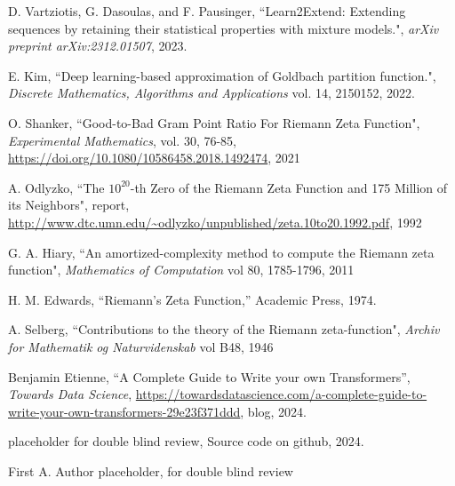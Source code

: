 \documentclass[journal]{IEEEtai}
\begin{document}
\begin{thebibliography}{34}
D. Vartziotis, G. Dasoulas,  and  F. Pausinger,
``Learn2Extend: Extending sequences by retaining their statistical properties with mixture models.",
\emph{arXiv preprint arXiv:2312.01507}, 2023.

E. Kim, 
``Deep learning-based approximation of Goldbach partition function.",
\emph{Discrete Mathematics, Algorithms and Applications} vol. 14,  2150152, 2022.

 O. Shanker, 
``Good-to-Bad Gram Point Ratio For Riemann Zeta Function",
\emph{Experimental Mathematics}, vol. 30, 76-85, 
\url{https://doi.org/10.1080/10586458.2018.1492474}, 2021

  A. Odlyzko,
``The $10^{20}$-th Zero of the Riemann Zeta
Function and 175 Million of its Neighbors", report,
\url{http://www.dtc.umn.edu/~odlyzko/unpublished/zeta.10to20.1992.pdf}, 1992

 G. A. Hiary,
``An amortized-complexity method to compute the Riemann zeta function", 
{\it Mathematics of Computation} vol 80, 1785-1796, 2011

 H. M. Edwards, ``Riemann's Zeta Function,'' 
Academic Press,  1974.

 A. Selberg,
``Contributions to the theory of the {R}iemann zeta-function", 
\emph{Archiv for Mathematik og Naturvidenskab} vol B48, 1946

 Benjamin Etienne, 
``A Complete Guide to Write your own Transformers'',
 \emph{Towards Data Science},
\url{https://towardsdatascience.com/a-complete-guide-to-write-your-own-transformers-29e23f371ddd}, blog,
2024. 

 placeholder for double blind review, 
Source code on github,
2024. 


\end{thebibliography}






\begin{IEEEbiography}{First A. Author}{\space}   placeholder, for double blind review
\end{IEEEbiography}
\end{document}
